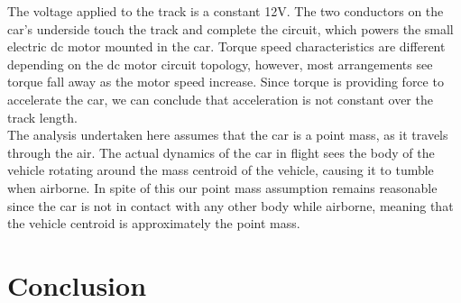 \documentclass[a4paper]{article}
\begin{document}
The voltage applied to the track is a constant 12$\si{\volt}$. The two conductors on the car's underside touch the track and complete the circuit, which powers the small electric dc motor mounted in the car. Torque speed characteristics are different depending on the dc motor circuit topology, however, most arrangements see torque fall away as the motor speed increase. Since torque is providing force to accelerate the car, we can conclude that acceleration is not constant over the track length.\\

The analysis undertaken here assumes that the car is a point mass, as it travels through the air. The actual dynamics of the car in flight sees the body of the vehicle rotating around the mass centroid of the vehicle, causing it to tumble when airborne. In spite of this our point mass assumption remains reasonable since the car is not in contact with any other body while airborne, meaning that the vehicle centroid is approximately the point mass. 

\section{Conclusion}



\end{document}
